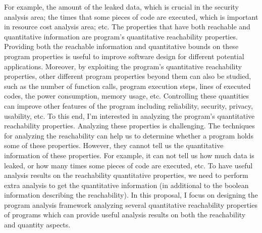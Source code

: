 For example, the amount of the leaked data, which is crucial in the security analysis area;
the times that some pieces of code are executed, which is important in resource cost analysis area; etc.
The properties that have both reachable and quantitative information are
program's quantitative reachability properties.
Providing both the reachable information and quantitative bounds on 
these program properties is useful to improve software design for different potential applications.
Moreover, 
by exploiting the program's quantitative reachability properties,
other different program properties beyond them can also be 
studied,
such as the number of function calls,
program execution steps,
lines of executed codes,
the power consumption, memory usage, etc. 
Controlling
these quantities
can improve other features of the program including reliability, security, privacy, usability, etc.
To this end, I'm interested in
analyzing the program's quantitative reachability properties.
Analyzing these properties is challenging.
The techniques for analyzing the reachability can help us to determine whether a program holds some of these properties.
However, they cannot tell us
the quantitative information of these properties.
For example, it can not tell us how much data is leaked, or
how many times some pieces of code are executed, etc.
To have useful analysis results on the reachability quantitative properties,
we need to perform extra analysis
to get the quantitative information
(in additional to the boolean information describing the reachability).
In this proposal, I focus on designing
the program analysis framework analyzing several quantitative reachability properties of programs
which can provide useful analysis results on both the reachability and quantity aspects.

